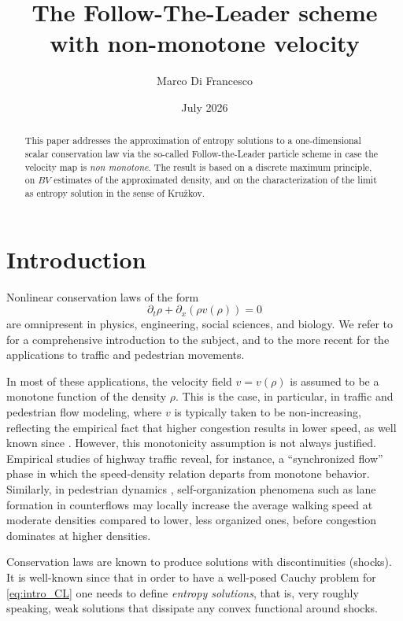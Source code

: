 \documentclass[reqno,oneside]{amsart}
\title[The Follow-The-Leader scheme with non-monotone velocities]{The Follow-The-Leader scheme with non-monotone velocity}
\author{Marco Di Francesco}
\date{July 2026}
\theoremstyle{plain}
\begin{document}
\begin{abstract}
    This paper addresses the approximation of entropy solutions to a one-dimensional scalar conservation law via the so-called Follow-the-Leader particle scheme in case the velocity map is \emph{non monotone}. The result is based on a discrete maximum principle, on $BV$ estimates of the approximated density, and on the characterization of the limit as entropy solution in the sense of Kru\v zkov.
\end{abstract}

\maketitle

\section{Introduction}

Nonlinear conservation laws of the form
\begin{equation}\label{eq:intro_CL}
    \partial_t \rho + \partial_x (\rho v(\rho))=0
\end{equation}
are omnipresent in physics, engineering, social sciences, and biology. We refer to \cite{dafermos_book} for a comprehensive introduction to the subject, and to the more recent \cite{rosini_book} for the applications to traffic and pedestrian movements. 

In most of these applications, the velocity field $v=v(\rho)$ is assumed to be a monotone function of the density $\rho$. This is the case, in particular, in traffic and pedestrian flow modeling, where $v$ is typically taken to be non-increasing, reflecting the empirical fact that higher congestion results in lower speed, as well known since \cite{Greenshields1935}. However, this monotonicity assumption is not always justified. Empirical studies of highway traffic reveal, for instance, a \enquote{synchronized flow} phase \cite{Kerner1998} in which the speed-density relation departs from monotone behavior. Similarly, in pedestrian dynamics \cite{Helbing1995}, self-organization phenomena such as lane formation in counterflows may locally increase the average walking speed at moderate densities compared to lower, less organized ones, before congestion dominates at higher densities. 

Conservation laws are known to produce solutions with discontinuities (shocks).
It is well-known since \cite{kruzkov} that in order to have a well-posed Cauchy problem for \eqref{eq:intro_CL} one needs to define \emph{entropy solutions}, that is, very roughly speaking, weak solutions that dissipate any convex functional around shocks. 
\end{document}
